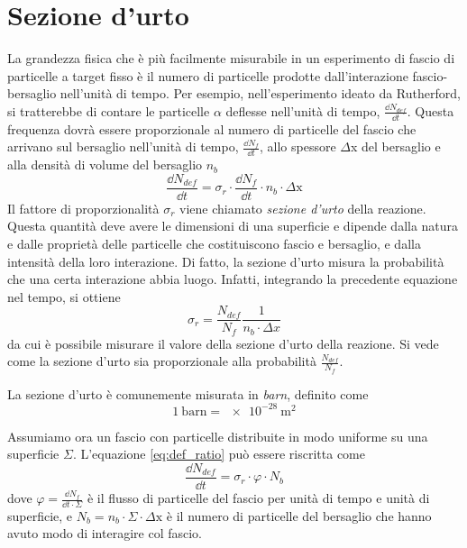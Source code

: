 \documentclass[../main.tex]{subfiles}
\begin{document}
\section{Sezione d'urto}
La grandezza fisica che è più facilmente misurabile in un esperimento di fascio di particelle a target fisso è il numero di particelle prodotte dall'interazione fascio-bersaglio nell'unità di tempo. Per esempio, nell'esperimento ideato da Rutherford, si tratterebbe di contare le particelle $\alpha$ deflesse nell'unità di tempo, $\frac{\dd N_{def}}{\dd t}$. 
Questa frequenza dovrà essere proporzionale al numero di particelle del fascio che arrivano sul bersaglio nell'unità di tempo, $\frac{\dd N_f}{\dd t}$, allo spessore $\Delta$x del bersaglio e alla densità di volume del bersaglio $n_b$
\begin{equation} \label{eq:def_ratio}
    \frac{\dd N_{def}}{\dd t} = \sigma_r \cdot \frac{\dd N_f}{\dd t} \cdot n_b \cdot \Delta \mathrm{x}
\end{equation}
Il fattore di proporzionalità $\sigma_r$ viene chiamato \textit{sezione d'urto} della reazione. Questa quantità deve avere le dimensioni di una superficie e dipende dalla natura e dalle proprietà delle particelle che costituiscono fascio e bersaglio, e dalla intensità della loro interazione. Di fatto, la sezione d'urto misura la probabilità che una certa interazione abbia luogo. Infatti, integrando la precedente equazione nel tempo, si ottiene 
\begin{equation}
    \sigma_r = \frac{N_{def}}{N_f} \frac{1}{n_b \cdot \Delta x}
\end{equation}
da cui è possibile misurare il valore della sezione d'urto della reazione. Si vede come la sezione d'urto sia proporzionale alla probabilità $\frac{N_{def}}{N_f}$.

La sezione d'urto è comunemente misurata in \textit{barn}, definito come
\begin{equation}
    1\ \mathrm{barn} = \SI{e-28}{\m ^2}
\end{equation}

Assumiamo ora un fascio con particelle distribuite in modo uniforme su una superficie $\Sigma$. L'equazione \ref{eq:def_ratio} può essere riscritta come 
\begin{equation}
    \frac{\dd N_{def}}{\dd t} = \sigma_r \cdot \varphi \cdot N_b
\end{equation}
dove $\varphi = \frac{\dd N_f}{\dd t \cdot \Sigma}$ è il flusso di particelle del fascio per unità di tempo e unità di superficie, e $N_b = n_b \cdot \Sigma \cdot \Delta \mathrm{x}$ è il numero di particelle del bersaglio che hanno avuto modo di interagire col fascio. 
\end{document}
